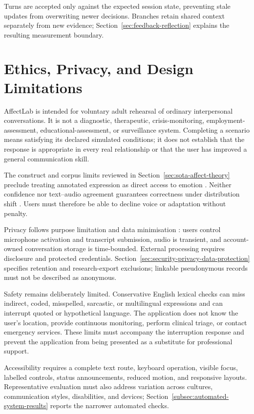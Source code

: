 Turns are accepted only against the expected session state, preventing stale updates from overwriting newer decisions. Branches retain shared context separately from new evidence; Section~\ref{sec:feedback-reflection} explains the resulting measurement boundary.

\section{Ethics, Privacy, and Design Limitations}
\label{sec:ethical-considerations-limitations}

AffectLab is intended for voluntary adult rehearsal of ordinary interpersonal conversations. It is not a diagnostic, therapeutic, crisis-monitoring, employment-assessment, educational-assessment, or surveillance system. Completing a scenario means satisfying its declared simulated conditions; it does not establish that the response is appropriate in every real relationship or that the user has improved a general communication skill.

The construct and corpus limits reviewed in Section~\ref{sec:sota-affect-theory} preclude treating annotated expression as direct access to emotion \cite{busso2008iemocap}. Neither confidence nor text--audio agreement guarantees correctness under distribution shift \cite{guo2017calibration,ovadia2019shift}. Users must therefore be able to decline voice or adaptation without penalty.

Privacy follows purpose limitation and data minimisation \cite{eu2016gdpr}: users control microphone activation and transcript submission, audio is transient, and account-owned conversation storage is time-bounded. External processing requires disclosure and protected credentials. Section~\ref{sec:security-privacy-data-protection} specifies retention and research-export exclusions; linkable pseudonymous records must not be described as anonymous.

Safety remains deliberately limited. Conservative English lexical checks can miss indirect, coded, misspelled, sarcastic, or multilingual expressions and can interrupt quoted or hypothetical language. The application does not know the user's location, provide continuous monitoring, perform clinical triage, or contact emergency services. These limits must accompany the interruption response and prevent the application from being presented as a substitute for professional support.

Accessibility requires a complete text route, keyboard operation, visible focus, labelled controls, status announcements, reduced motion, and responsive layouts. Representative evaluation must also address variation across cultures, communication styles, disabilities, and devices; Section~\ref{subsec:automated-system-results} reports the narrower automated checks.

